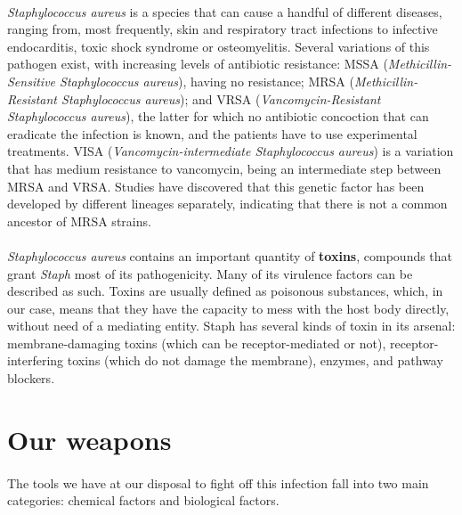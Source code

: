 \paragraph{}\emph{Staphylococcus aureus} is a species that can cause a handful of different diseases, ranging from, most frequently, skin and respiratory tract infections to infective endocarditis, toxic shock syndrome or osteomyelitis. Several variations of this pathogen exist, with increasing levels of antibiotic resistance: MSSA (\emph{Methicillin-Sensitive Staphylococcus aureus}), having no resistance; MRSA (\emph{Methicillin-Resistant Staphylococcus aureus}); and VRSA (\emph{Vancomycin-Resistant Staphylococcus aureus}), the   latter for which no antibiotic concoction that can eradicate the infection is known, and the patients have to use experimental treatments. VISA (\emph{Vancomycin-intermediate Staphylococcus aureus}) is a variation that has medium resistance to vancomycin, being an intermediate step between MRSA and VRSA. Studies have discovered that this genetic factor has been developed by different lineages separately, indicating that there is not a common ancestor of MRSA strains.
\paragraph{}\emph{Staphylococcus aureus} contains an important quantity of \textbf{toxins}, compounds that grant \emph{Staph} most of its pathogenicity. Many of its virulence factors can be described as such. Toxins are usually defined as poisonous substances, which, in our case, means that they have the capacity to mess with the host body directly, without need of a mediating entity. Staph has several kinds of toxin in its arsenal: membrane-damaging toxins (which can be receptor-mediated or not), receptor-interfering toxins (which do not damage the membrane), enzymes, and pathway blockers\cite{kongTargetingStaphylococcusAureus2016}.\newline
\section{Our weapons}
\paragraph{} The tools we have at our disposal to fight off this infection fall into two main categories: chemical factors and biological factors.
